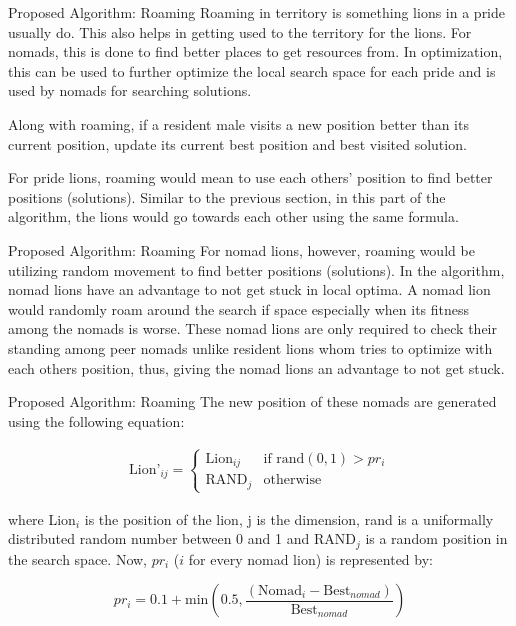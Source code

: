 \documentclass{beamer}
\begin{document}
\begin{frame}{Proposed Algorithm: Roaming}
Roaming in territory is something lions in a pride usually do. This also helps in getting used to the territory for the lions. For nomads, this is done to find better places to get resources from. In optimization, this can be used to further optimize the local search space for each pride and is used by nomads for searching solutions.

Along with roaming, if a resident male visits a new position better than its current position, update its current best position and best visited solution.

For pride lions, roaming would mean to use each others' position to find better positions (solutions). Similar to the previous section, in this part of the algorithm, the lions would go towards each other using the same formula. 
\end{frame}
\begin{frame}{Proposed Algorithm: Roaming}
For nomad lions, however, roaming would be utilizing random movement to find better positions (solutions). In the algorithm, nomad lions have an advantage to not get stuck in local optima. A nomad lion would randomly roam around the search if space especially when its fitness among the nomads is worse. These nomad lions are only required to check their standing among peer nomads unlike resident lions whom tries to optimize with each others position, thus, giving the nomad lions an advantage to not get stuck. 
\end{frame}
\begin{frame}{Proposed Algorithm: Roaming}
The new position of these nomads are generated using the following equation:

\begin{align*}
 \text{Lion'}_{ij} =
  \begin{cases}
   \text{Lion}_{ij}        & \text{if rand}(0,1)  > pr_i \\
   \text{RAND}_j        & \text{otherwise}
 \end{cases}
\end{align*}

where Lion$_{i}$ is the position of the lion, j is the dimension, rand is a uniformally distributed random number between 0 and 1 and RAND$_j$ is a random position in the search space. Now, $pr_i$ ($i$ for every nomad lion) is represented by:

$$
pr_i = 0.1 + \text{min}\left(0.5, \frac{ (\text{Nomad}_i - \text{Best}_{nomad}) }{ \text{Best}_{nomad} }\right)
$$
\end{frame}
\end{document}
